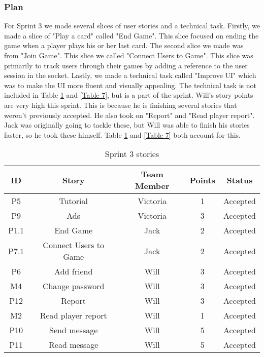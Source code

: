\subsubsection{Plan}
For Sprint 3 we made several slices of user stories and a technical task. Firstly, we made a slice of "Play a card" called "End Game". This slice focused on ending the game when a player plays his or her last card. The second slice we made was from "Join Game". This slice we called "Connect Users to Game". This slice was primarily to track users through their games by adding a reference to the user session in the socket. Lastly, we made a technical task called "Improve UI" which was to make the UI more fluent and visually appealing. The technical task is not included in Table \ref{Table 6} and \ref{Table 7}, but is a part of the sprint. Will's story points are very high this sprint. This is because he is finishing several stories that weren't previously accepted. He also took on "Report" and "Read player report". Jack was originally going to tackle these, but Will was able to finish his stories faster, so he took these himself. Table \ref{Table 6} and \ref{Table 7} both account for this.

\begin{table}[h]
\centering
\begin{tabular}{|c|c|c|c|c|}
\hline
\textbf{ID} & \textbf{Story}    & \textbf{Team Member} & \textbf{Points} & \textbf{Status} \\ \hline
P5   & Tutorial              & Victoria    & 1      & Accepted \\ \hline
P9   & Ads                   & Victoria    & 3      & Accepted \\ \hline
P1.1 & End Game              & Jack        & 2      & Accepted \\ \hline
P7.1 & Connect Users to Game & Jack        & 2      & Accepted \\ \hline
P6   & Add friend            & Will        & 3      & Accepted \\ \hline
M4   & Change password       & Will        & 3      & Accepted \\ \hline
P12  & Report                & Will        & 3      & Accepted \\ \hline
M2   & Read player report    & Will        & 1      & Accepted \\ \hline
P10  & Send message          & Will        & 5      & Accepted \\ \hline
P11  & Read message          & Will        & 5      & Accepted \\ \hline
\end{tabular}
\caption{Sprint 3 stories}
\label{Table 6}
\end{table}

